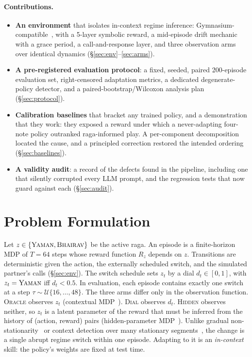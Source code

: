 \documentclass[11pt]{article}
\newcommand{\hidden}{\textsc{Hidden}}
\newcommand{\dial}{\textsc{Dial}}
\newcommand{\oracle}{\textsc{Oracle}}
\begin{document}
\paragraph{Contributions.}
\begin{itemize}[leftmargin=*,itemsep=2pt]
  \item \textbf{An environment} that isolates in-context regime inference: Gymnasium-compatible~\citep{towers2024gymnasium}, with a 5-layer symbolic reward, a mid-episode drift mechanic with a grace period, a call-and-response layer, and three observation arms over identical dynamics (\S\ref{sec:env}--\ref{sec:arms}).
  \item \textbf{A pre-registered evaluation protocol}: a fixed, seeded, paired 200-episode evaluation set, right-censored adaptation metrics, a dedicated degenerate-policy detector, and a paired-bootstrap/Wilcoxon analysis plan (\S\ref{sec:protocol}).
  \item \textbf{Calibration baselines} that bracket any trained policy, and a demonstration that they work: they exposed a reward under which a never-adapting four-note policy outranked raga-informed play. A per-component decomposition located the cause, and a principled correction restored the intended ordering (\S\ref{sec:baselines}).
  \item \textbf{A validity audit}: a record of the defects found in the pipeline, including one that silently corrupted every LLM prompt, and the regression tests that now guard against each (\S\ref{sec:audit}).
\end{itemize}

\section{Problem Formulation}
\label{sec:formulation}

Let $z \in \{\textsc{Yaman}, \textsc{Bhairav}\}$ be the active raga. An episode is a finite-horizon MDP of $T=64$ steps whose reward function $R_z$ depends on $z$. Transitions are deterministic given the action, the externally scheduled switch, and the simulated partner's calls (\S\ref{sec:env}). The switch schedule sets $z_t$ by a dial $d_t \in [0,1]$, with $z_t = \textsc{Yaman}$ iff $d_t < 0.5$. In evaluation, each episode contains exactly one switch at a step $\tau \sim \mathcal{U}\{16,\dots,48\}$. The three arms differ only in the observation function. \oracle{} observes $z_t$ (contextual MDP~\citep{hallak2015cmdp}). \dial{} observes $d_t$. \hidden{} observes neither, so $z_t$ is a latent parameter of the reward that must be inferred from the history of (action, reward) pairs (hidden-parameter MDP~\citep{doshivelez2013hipmdp}). Unlike gradual non-stationarity~\citep{padakandla2020survey} or context detection over many stationary segments~\citep{dasilva2006context}, the change is a single abrupt regime switch within one episode. Adapting to it is an \emph{in-context} skill: the policy's weights are fixed at test time.
\end{document}
